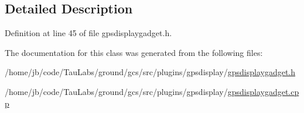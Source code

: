 \subsection{\-Detailed \-Description}


\-Definition at line 45 of file gpsdisplaygadget.\-h.



\-The documentation for this class was generated from the following files\-:\begin{DoxyCompactItemize}
\item 
/home/jb/code/\-Tau\-Labs/ground/gcs/src/plugins/gpsdisplay/\hyperlink{gpsdisplaygadget_8h}{gpsdisplaygadget.\-h}\item 
/home/jb/code/\-Tau\-Labs/ground/gcs/src/plugins/gpsdisplay/\hyperlink{gpsdisplaygadget_8cpp}{gpsdisplaygadget.\-cpp}\end{DoxyCompactItemize}
